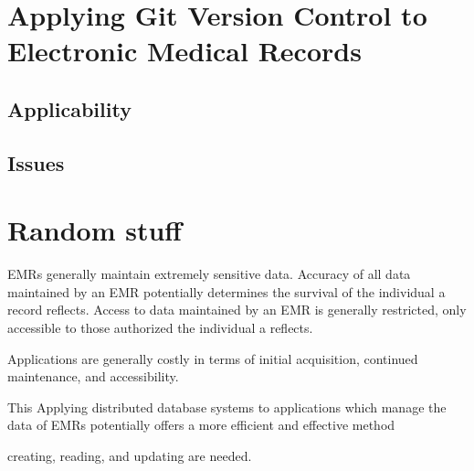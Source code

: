 \documentclass{acm_proc_article-sp}
\begin{document}
\section{Applying Git Version Control to Electronic Medical Records}

\subsection{Applicability}
\subsection{Issues}



\section{Random stuff}

EMRs generally maintain extremely sensitive data.  Accuracy of all data
maintained by an EMR potentially determines the survival of the individual a record 
reflects.  Access to data maintained by an EMR is generally restricted, only accessible 
to those authorized the individual a reflects.

Applications are generally costly in terms of initial acquisition, continued maintenance, 
and accessibility.




This Applying distributed database systems to applications which manage the data of EMRs
potentially offers a more efficient and effective method 

creating, reading, and updating are needed.
\end{document}
